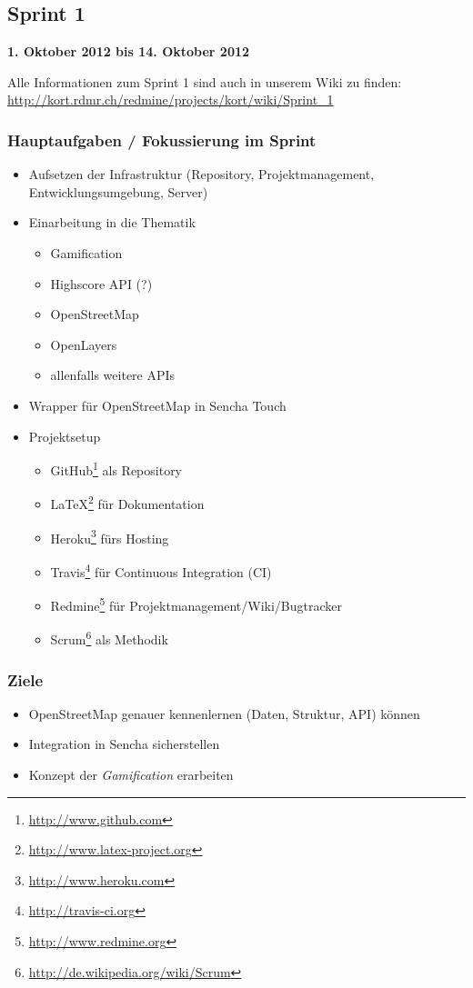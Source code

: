 \subsection{Sprint 1}

\textbf{1. Oktober 2012 bis 14. Oktober 2012}

Alle Informationen zum Sprint 1 sind auch in unserem Wiki zu finden:
\url{http://kort.rdmr.ch/redmine/projects/kort/wiki/Sprint_1}

\subsubsection{Hauptaufgaben / Fokussierung im Sprint}

\begin{itemize}
	\item Aufsetzen der Infrastruktur (Repository, Projektmanagement, Entwicklungsumgebung, Server)
	\item Einarbeitung in die Thematik
	\begin{itemize}
		\item Gamification
		\item Highscore API (?)
		\item \gls{OpenStreetMap}
		\item OpenLayers
		\item allenfalls weitere \gls{API}s
	\end{itemize}
	\item Wrapper für \gls{OpenStreetMap} in Sencha Touch
	\item Projektsetup
	\begin{itemize}
		\item GitHub\footnote{\url{http://www.github.com}} als Repository
		\item \LaTeX{}\footnote{\url{http://www.latex-project.org}} für Dokumentation
		\item Heroku\footnote{\url{http://www.heroku.com}} fürs Hosting
		\item Travis\footnote{\url{http://travis-ci.org}} für Continuous Integration (CI)
		\item Redmine\footnote{\url{http://www.redmine.org}} für Projektmanagement/Wiki/Bugtracker
		\item Scrum\footnote{\url{http://de.wikipedia.org/wiki/Scrum}} als Methodik
	\end{itemize}
\end{itemize}

\subsubsection{Ziele}
\begin{itemize}
	\item \gls{OpenStreetMap} genauer kennenlernen (Daten, Struktur, \gls{API}) können
	\item Integration in Sencha sicherstellen
	\item Konzept der \emph{Gamification} erarbeiten
\end{itemize}

